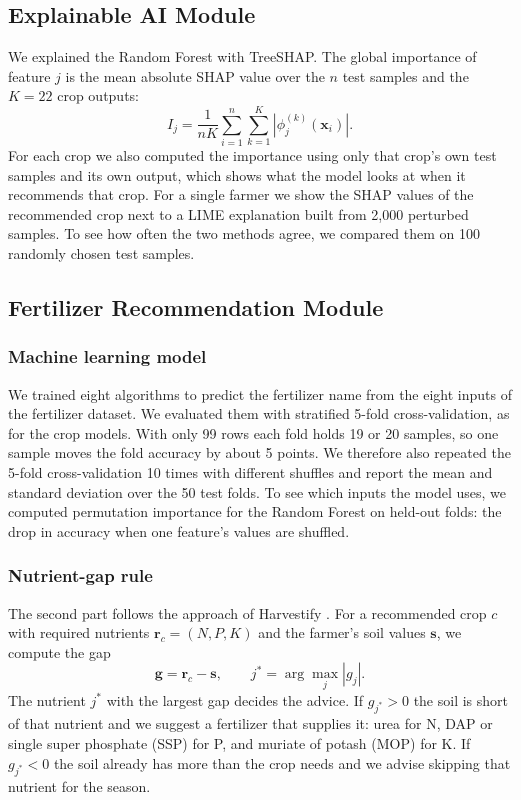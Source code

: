\documentclass[conference]{IEEEtran}
\begin{document}
\subsection{Explainable AI Module}

We explained the Random Forest with TreeSHAP. The global importance of feature $j$ is the mean absolute SHAP value over the $n$ test samples and the $K=22$ crop outputs:
\begin{equation}
I_j = \frac{1}{nK}\sum_{i=1}^{n}\sum_{k=1}^{K} \left|\phi_j^{(k)}(\mathbf{x}_i)\right|.
\end{equation}
For each crop we also computed the importance using only that crop's own test samples and its own output, which shows what the model looks at when it recommends that crop. For a single farmer we show the SHAP values of the recommended crop next to a LIME explanation built from 2,000 perturbed samples. To see how often the two methods agree, we compared them on 100 randomly chosen test samples.

\subsection{Fertilizer Recommendation Module}

\subsubsection{Machine learning model}
We trained eight algorithms to predict the fertilizer name from the eight inputs of the fertilizer dataset. We evaluated them with stratified 5-fold cross-validation, as for the crop models. With only 99 rows each fold holds 19 or 20 samples, so one sample moves the fold accuracy by about 5 points. We therefore also repeated the 5-fold cross-validation 10 times with different shuffles and report the mean and standard deviation over the 50 test folds. To see which inputs the model uses, we computed permutation importance for the Random Forest on held-out folds: the drop in accuracy when one feature's values are shuffled.

\subsubsection{Nutrient-gap rule}
The second part follows the approach of Harvestify \cite{harvestify}. For a recommended crop $c$ with required nutrients $\mathbf{r}_c = (N, P, K)$ and the farmer's soil values $\mathbf{s}$, we compute the gap
\begin{equation}
\mathbf{g} = \mathbf{r}_c - \mathbf{s}, \qquad j^{*} = \arg\max_{j} |g_j|.
\end{equation}
The nutrient $j^{*}$ with the largest gap decides the advice. If $g_{j^*} > 0$ the soil is short of that nutrient and we suggest a fertilizer that supplies it: urea for N, DAP or single super phosphate (SSP) for P, and muriate of potash (MOP) for K. If $g_{j^*} < 0$ the soil already has more than the crop needs and we advise skipping that nutrient for the season.
\end{document}
